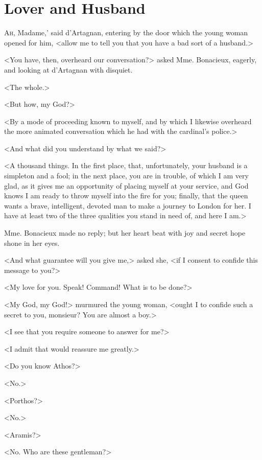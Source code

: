 
\chapter{Lover and Husband}

\lettrine[,ante=`]{A}{h,} Madame,' said d'Artagnan, entering by the door which the young woman opened for him, <allow me to tell you that you have a bad sort of a husband.> 

\zz
<You have, then, overheard our conversation?> asked Mme. Bonacieux, eagerly, and looking at d'Artagnan with disquiet. 

<The whole.> 

<But how, my God?> 

<By a mode of proceeding known to myself, and by which I likewise overheard the more animated conversation which he had with the cardinal's police.> 

<And what did you understand by what we said?> 

<A thousand things. In the first place, that, unfortunately, your husband is a simpleton and a fool; in the next place, you are in trouble, of which I am very glad, as it gives me an opportunity of placing myself at your service, and God knows I am ready to throw myself into the fire for you; finally, that the queen wants a brave, intelligent, devoted man to make a journey to London for her. I have at least two of the three qualities you stand in need of, and here I am.> 

Mme. Bonacieux made no reply; but her heart beat with joy and secret hope shone in her eyes. 

<And what guarantee will you give me,> asked she, <if I consent to confide this message to you?> 

<My love for you. Speak! Command! What is to be done?> 

<My God, my God!> murmured the young woman, <ought I to confide such a secret to you, monsieur? You are almost a boy.> 

<I see that you require someone to answer for me?> 

<I admit that would reassure me greatly.> 

<Do you know Athos?> 

<No.> 

<Porthos?> 

<No.> 

<Aramis?> 

<No. Who are these gentleman?> 

